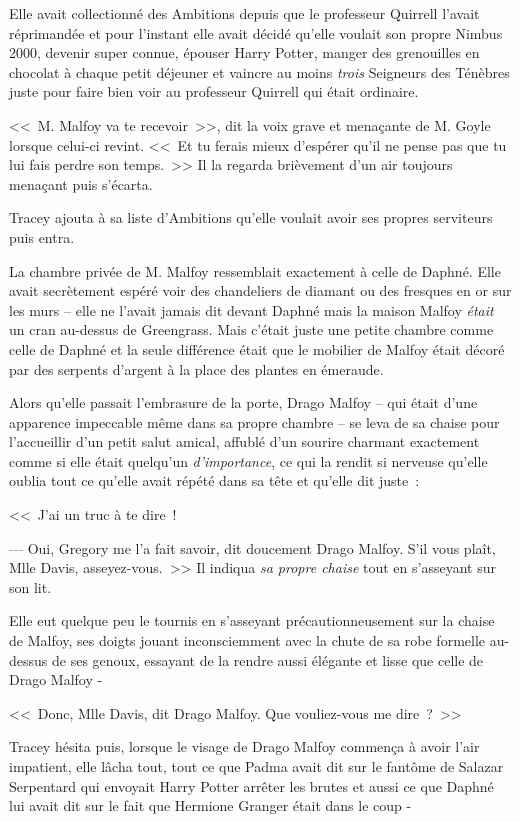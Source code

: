 Elle avait collectionné des Ambitions depuis que le professeur Quirrell l'avait réprimandée et pour l'instant elle avait décidé qu'elle voulait son propre Nimbus 2000, devenir super connue, épouser Harry Potter, manger des grenouilles en chocolat à chaque petit déjeuner et vaincre au moins \emph{trois} Seigneurs des Ténèbres juste pour faire bien voir au professeur Quirrell qui était ordinaire.

<<~M. Malfoy va te recevoir~>>, dit la voix grave et menaçante de M. Goyle lorsque celui-ci revint. <<~Et tu ferais mieux d'espérer qu'il ne pense pas que tu lui fais perdre son temps.~>> Il la regarda brièvement d'un air toujours menaçant puis s'écarta.

Tracey ajouta à sa liste d'Ambitions qu'elle voulait avoir ses propres serviteurs puis entra.

La chambre privée de M. Malfoy ressemblait exactement à celle de Daphné. Elle avait secrètement espéré voir des chandeliers de diamant ou des fresques en or sur les murs -- elle ne l'avait jamais dit devant Daphné mais la maison Malfoy \emph{était} un cran au-dessus de Greengrass. Mais c'était juste une petite chambre comme celle de Daphné et la seule différence était que le mobilier de Malfoy était décoré par des serpents d'argent à la place des plantes en émeraude.

Alors qu'elle passait l'embrasure de la porte, Drago Malfoy -- qui était d'une apparence impeccable même dans sa propre chambre -- se leva de sa chaise pour l'accueillir d'un petit salut amical, affublé d'un sourire charmant exactement comme si elle était quelqu'un \emph{d'importance}, ce qui la rendit si nerveuse qu'elle oublia tout ce qu'elle avait répété dans sa tête et qu'elle dit juste~:

<<~J'ai un truc à te dire~!

--- Oui, Gregory me l'a fait savoir, dit doucement Drago Malfoy. S'il vous plaît, Mlle Davis, asseyez-vous.~>> Il indiqua \emph{sa propre chaise} tout en s'asseyant sur son lit.

Elle eut quelque peu le tournis en s'asseyant précautionneusement sur la chaise de Malfoy, ses doigts jouant inconsciemment avec la chute de sa robe formelle au-dessus de ses genoux, essayant de la rendre aussi élégante et lisse que celle de Drago Malfoy -

<<~Donc, Mlle Davis, dit Drago Malfoy. Que vouliez-vous me dire~?~>>

Tracey hésita puis, lorsque le visage de Drago Malfoy commença à avoir l'air impatient, elle lâcha tout, tout ce que Padma avait dit sur le fantôme de Salazar Serpentard qui envoyait Harry Potter arrêter les brutes et aussi ce que Daphné lui avait dit sur le fait que Hermione Granger était dans le coup -

